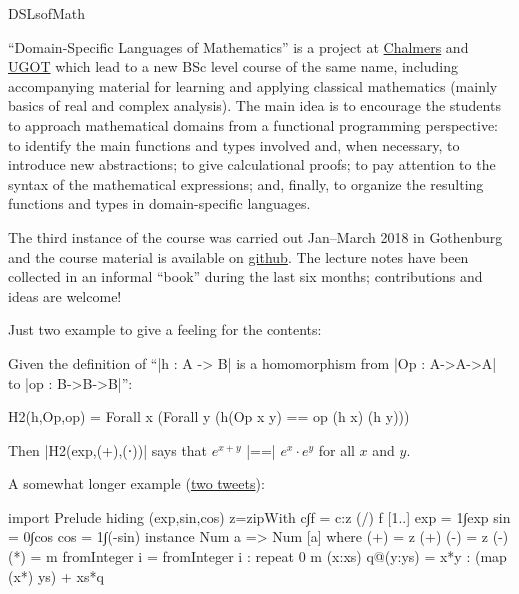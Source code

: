 \begin{hcarentry}[updated]{DSLsofMath}
\label{dslsofmath}
\makeheader

{
\def\doubleequalsdslm{\mathrel{\unitlength 0.01em
  \begin{picture}(78,40)
    \put(7,34){\line(1,0){25}} \put(45,34){\line(1,0){25}}
    \put(7,14){\line(1,0){25}} \put(45,14){\line(1,0){25}}
  \end{picture}}}

``Domain-Specific Languages of Mathematics'' is a project at
\href{http://www.chalmers.se/en/Pages/default.aspx}{Chalmers} and
\href{http://www.gu.se/english}{UGOT} which lead to a new BSc level course of
the same name, including accompanying material for learning and applying
classical mathematics (mainly basics of real and complex analysis).
%
The main idea is to encourage the students to approach mathematical domains
from a functional programming perspective:
%
to identify the main functions and types involved and, when necessary, to
introduce new abstractions;
%
to give calculational proofs;
%
to pay attention to the syntax of the mathematical expressions;
%
and, finally, to organize the resulting functions and types in domain-specific
languages.

The third instance of the course was carried out Jan--March 2018 in Gothenburg
and the course material is available on
\href{https://github.com/DSLsofMath/DSLsofMath}{github}.
%
The lecture notes have been collected in an informal ``book'' during
the last six months; contributions and ideas are welcome!

Just two example to give a feeling for the contents:

Given the definition of ``|h : A -> B| is a homomorphism from
|Op : A->A->A| to |op : B->B->B|'':
\begin{spec}
H2(h,Op,op) = Forall x (Forall y (h(Op x y) == op (h x) (h y)))
\end{spec}
Then |H2(exp,(+),(⋅))| says that $e^{x+y}$ |==| $e^x \cdot e^y$
for all $x$ and $y$.

A somewhat longer example (\href{https://twitter.com/patrikja/status/966074410611413000}{two tweets}):
\begin{code}
import Prelude hiding (exp,sin,cos)
z=zipWith
c∫f  = c:z (/) f [1..]
exp  = 1∫exp
sin  = 0∫cos
cos  = 1∫(-sin)
instance Num a => Num [a] where
  (+)  = z (+)
  (-)  = z (-)
  (*)  = m
  fromInteger i = fromInteger i : repeat 0
m (x:xs) q@(y:ys) = x*y : (map (x*) ys) + xs*q


\end{code}}
\end{hcarentry}
